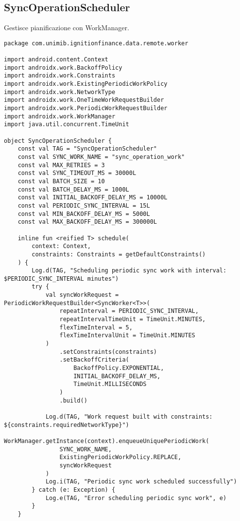 \subsection{SyncOperationScheduler}\label{subsec:syncoperationscheduler} Gestisce pianificazione con WorkManager.

\begin{lstlisting}[caption=SyncOperationScheduler.kt, label=lst:syncoperationscheduler, basicstyle=\ttfamily\scriptsize, breaklines=true, breakatwhitespace=true, tabsize=4]
package com.unimib.ignitionfinance.data.remote.worker

import android.content.Context
import androidx.work.BackoffPolicy
import androidx.work.Constraints
import androidx.work.ExistingPeriodicWorkPolicy
import androidx.work.NetworkType
import androidx.work.OneTimeWorkRequestBuilder
import androidx.work.PeriodicWorkRequestBuilder
import androidx.work.WorkManager
import java.util.concurrent.TimeUnit

object SyncOperationScheduler {
    const val TAG = "SyncOperationScheduler"
    const val SYNC_WORK_NAME = "sync_operation_work"
    const val MAX_RETRIES = 3
    const val SYNC_TIMEOUT_MS = 30000L
    const val BATCH_SIZE = 10
    const val BATCH_DELAY_MS = 1000L
    const val INITIAL_BACKOFF_DELAY_MS = 10000L
    const val PERIODIC_SYNC_INTERVAL = 15L
    const val MIN_BACKOFF_DELAY_MS = 5000L
    const val MAX_BACKOFF_DELAY_MS = 300000L

    inline fun <reified T> schedule(
        context: Context,
        constraints: Constraints = getDefaultConstraints()
    ) {
        Log.d(TAG, "Scheduling periodic sync work with interval: $PERIODIC_SYNC_INTERVAL minutes")
        try {
            val syncWorkRequest = PeriodicWorkRequestBuilder<SyncWorker<T>>(
                repeatInterval = PERIODIC_SYNC_INTERVAL,
                repeatIntervalTimeUnit = TimeUnit.MINUTES,
                flexTimeInterval = 5,
                flexTimeIntervalUnit = TimeUnit.MINUTES
            )
                .setConstraints(constraints)
                .setBackoffCriteria(
                    BackoffPolicy.EXPONENTIAL,
                    INITIAL_BACKOFF_DELAY_MS,
                    TimeUnit.MILLISECONDS
                )
                .build()

            Log.d(TAG, "Work request built with constraints: ${constraints.requiredNetworkType}")
            WorkManager.getInstance(context).enqueueUniquePeriodicWork(
                SYNC_WORK_NAME,
                ExistingPeriodicWorkPolicy.REPLACE,
                syncWorkRequest
            )
            Log.i(TAG, "Periodic sync work scheduled successfully")
        } catch (e: Exception) {
            Log.e(TAG, "Error scheduling periodic sync work", e)
        }
    }


\end{lstlisting}
